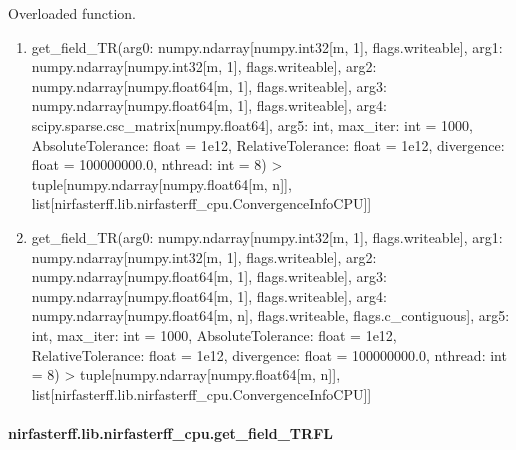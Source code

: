 \documentclass[letterpaper,10pt,english]{sphinxmanual}
\begin{document}
\begin{fulllineitems}
\label{\detokenize{_autosummary/nirfasterff.lib.nirfasterff_cpu.get_field_TR:nirfasterff.lib.nirfasterff_cpu.get_field_TR}}
\pysigstartsignatures
{}
\pysigstopsignatures
\sphinxAtStartPar
Overloaded function.
\begin{enumerate}
%
\item {} 
\sphinxAtStartPar
get\_field\_TR(arg0: numpy.ndarray{[}numpy.int32{[}m, 1{]}, flags.writeable{]}, arg1: numpy.ndarray{[}numpy.int32{[}m, 1{]}, flags.writeable{]}, arg2: numpy.ndarray{[}numpy.float64{[}m, 1{]}, flags.writeable{]}, arg3: numpy.ndarray{[}numpy.float64{[}m, 1{]}, flags.writeable{]}, arg4: scipy.sparse.csc\_matrix{[}numpy.float64{]}, arg5: int, max\_iter: int = 1000, AbsoluteTolerance: float = 1e\sphinxhyphen{}12, RelativeTolerance: float = 1e\sphinxhyphen{}12, divergence: float = 100000000.0, nthread: int = 8) \sphinxhyphen{}\textgreater{} tuple{[}numpy.ndarray{[}numpy.float64{[}m, n{]}{]}, list{[}nirfasterff.lib.nirfasterff\_cpu.ConvergenceInfoCPU{]}{]}

\item {} 
\sphinxAtStartPar
get\_field\_TR(arg0: numpy.ndarray{[}numpy.int32{[}m, 1{]}, flags.writeable{]}, arg1: numpy.ndarray{[}numpy.int32{[}m, 1{]}, flags.writeable{]}, arg2: numpy.ndarray{[}numpy.float64{[}m, 1{]}, flags.writeable{]}, arg3: numpy.ndarray{[}numpy.float64{[}m, 1{]}, flags.writeable{]}, arg4: numpy.ndarray{[}numpy.float64{[}m, n{]}, flags.writeable, flags.c\_contiguous{]}, arg5: int, max\_iter: int = 1000, AbsoluteTolerance: float = 1e\sphinxhyphen{}12, RelativeTolerance: float = 1e\sphinxhyphen{}12, divergence: float = 100000000.0, nthread: int = 8) \sphinxhyphen{}\textgreater{} tuple{[}numpy.ndarray{[}numpy.float64{[}m, n{]}{]}, list{[}nirfasterff.lib.nirfasterff\_cpu.ConvergenceInfoCPU{]}{]}

\end{enumerate}

\end{fulllineitems}


\sphinxstepscope


\paragraph{nirfasterff.lib.nirfasterff\_cpu.get\_field\_TRFL}
\label{\detokenize{_autosummary/nirfasterff.lib.nirfasterff_cpu.get_field_TRFL:nirfasterff-lib-nirfasterff-cpu-get-field-trfl}}\label{\detokenize{_autosummary/nirfasterff.lib.nirfasterff_cpu.get_field_TRFL::doc}}
\end{document}
